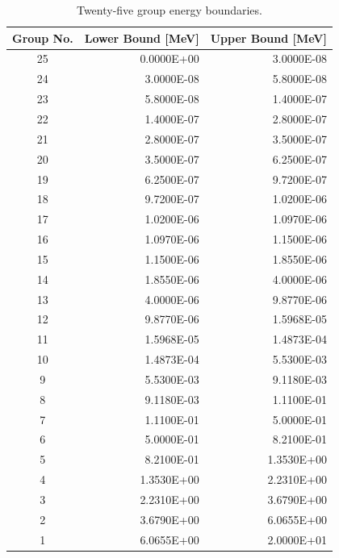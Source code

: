 \begin{appendices}
\begin{table}[h!]
  \centering
  \footnotesize
  \caption{Twenty-five group energy boundaries.}
  \label{table:app-25-groups} 
  \vspace{14pt}
  \begin{tabular}{c r r}
    \toprule
    {\bf Group No.} &
    {\bf Lower Bound [MeV]} &
    {\bf Upper Bound [MeV]} \\
    \midrule
25 & 0.0000E+00 & 3.0000E-08 \\
24 & 3.0000E-08 & 5.8000E-08 \\
23 & 5.8000E-08 & 1.4000E-07 \\
22 & 1.4000E-07 & 2.8000E-07 \\
21 & 2.8000E-07 & 3.5000E-07 \\
20 & 3.5000E-07 & 6.2500E-07 \\
19 & 6.2500E-07 & 9.7200E-07 \\
18 & 9.7200E-07 & 1.0200E-06 \\
17 & 1.0200E-06 & 1.0970E-06 \\
16 & 1.0970E-06 & 1.1500E-06 \\
15 & 1.1500E-06 & 1.8550E-06 \\
14 & 1.8550E-06 & 4.0000E-06 \\
13 & 4.0000E-06 & 9.8770E-06 \\
12 & 9.8770E-06 & 1.5968E-05 \\
11 & 1.5968E-05 & 1.4873E-04 \\
10 & 1.4873E-04 & 5.5300E-03 \\
9 & 5.5300E-03 & 9.1180E-03 \\
8 & 9.1180E-03 & 1.1100E-01 \\
7 & 1.1100E-01 & 5.0000E-01 \\
6 & 5.0000E-01 & 8.2100E-01 \\
5 & 8.2100E-01 & 1.3530E+00 \\
4 & 1.3530E+00 & 2.2310E+00 \\
3 & 2.2310E+00 & 3.6790E+00 \\
2 & 3.6790E+00 & 6.0655E+00 \\
1 & 6.0655E+00 & 2.0000E+01 \\
  \bottomrule
 \end{tabular}
\end{table}


\end{appendices}

